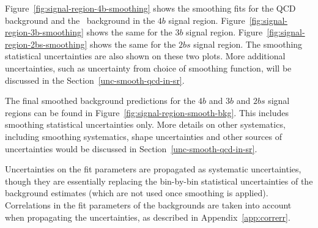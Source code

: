 Figure~\ref{fig:signal-region-4b-smoothing} shows the smoothing fits for the  QCD background and the \ttbar\ background in the $4b$ signal region.  Figure~\ref{fig:signal-region-3b-smoothing} shows the same for the $3b$ signal region. Figure~\ref{fig:signal-region-2bs-smoothing} shows the same for the $2bs$ signal region. The smoothing statistical uncertainties are also shown on these two plots. More additional uncertainties, such as uncertainty from choice of smoothing function, will be discussed in the Section~\ref{unc-smooth-qcd-in-sr}.

The final smoothed background predictions for the $4b$ and $3b$ and $2bs$ signal regions can be found in Figure~\ref{fig:signal-region-smooth-bkg}. This includes smoothing statistical uncertainties only. More details on other systematics, including smoothing systematics, shape uncertainties and other sources of uncertainties would be discussed in Section~\ref{unc-smooth-qcd-in-sr}.

Uncertainties on the fit parameters are propagated as systematic uncertainties, though they are essentially replacing the bin-by-bin statistical uncertainties of the background estimates (which are not used once smoothing is applied). Correlations in the fit parameters of the backgrounds are taken into account when propagating the uncertainties, as described in Appendix~\ref{app:correrr}.




